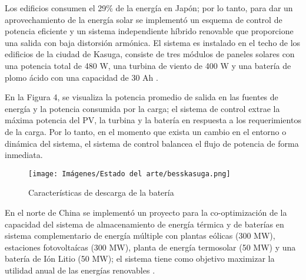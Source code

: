 \newline
Los edificios consumen el 29\% de la energía en Japón; por lo tanto, para dar un aprovechamiento de la energía solar se implementó un esquema de control de potencia eficiente y un sistema independiente híbrido renovable que proporcione una salida con baja distorsión armónica. El sistema es instalado en el techo de los edificios de la ciudad de Kasuga, consiste de tres módulos de paneles solares con una potencia total de 480 W, una turbina de viento de 400 W y una batería de plomo ácido con una capacidad de 30 Ah \cite{BESS_KASUGA_JAPON}.

En la Figura 4, se visualiza la potencia promedio de salida en las fuentes de energía y la potencia consumida por la carga; el sistema de control extrae la máxima potencia del PV, la turbina y la batería en respuesta a los requerimientos de la carga. Por lo tanto, en el momento que exista un cambio en el entorno o dinámica del sistema, el sistema de control balancea el flujo de potencia de forma inmediata. 
\begin{figure}[h!]
    \begin{center}
    \centering
\texttt{[image: Imágenes/Estado del arte/besskasuga.png]}
	\caption{ Características de descarga de la batería \cite{BESS_KASUGA_JAPON}}
    \end{center}
\end{figure}

En el norte de China se implementó un proyecto para  la co-optimización de  la capacidad del sistema de almacenamiento de energía térmica y de baterías en sistema complementario de energía múltiple con plantas eólicas (300 MW), estaciones fotovoltaícas (300 MW), planta de energía termosolar (50 MW) y una batería de Ión Litio (50 MW); el sistema tiene como objetivo maximizar la utilidad anual de las energías renovables \cite{li2019capacity}.

